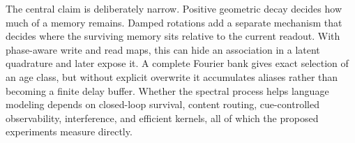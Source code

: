 \documentclass[11pt]{article}
\begin{document}
The central claim is deliberately narrow. Positive geometric decay decides how much of a
memory remains. Damped rotations add a separate mechanism that decides where the surviving
memory sits relative to the current readout. With phase-aware write and read maps, this can
hide an association in a latent quadrature and later expose it. A complete Fourier bank gives
exact selection of an age class, but without explicit overwrite it accumulates aliases rather
than becoming a finite delay buffer. Whether the spectral process helps language modeling
depends on closed-loop survival, content routing, cue-controlled observability, interference,
and efficient kernels, all of which the proposed experiments measure directly.



\end{document}
